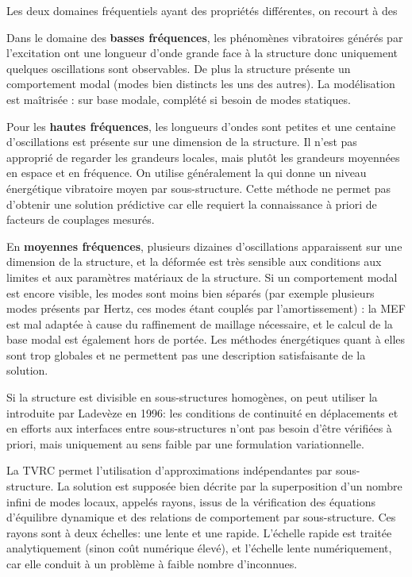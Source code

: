 Les deux domaines fréquentiels ayant des propriétés différentes, on recourt à des 

\medskip
Dans le domaine des \textbf{basses fréquences}, les phénomènes vibratoires générés par l'excitation ont une longueur
d'onde grande face à la structure donc uniquement quelques oscillations sont observables. De plus
la structure présente un comportement modal (modes bien distincts les uns des autres).
La modélisation est maîtrisée :  sur base modale, complété si besoin de modes
statiques.

\medskip
Pour les \textbf{hautes fréquences}, les longueurs d'ondes sont petites et une centaine d'oscillations est présente sur une
dimension de la structure. Il n'est pas approprié de regarder les grandeurs locales, mais plutôt les
grandeurs moyennées en espace et en fréquence. On utilise généralement la  
qui donne un niveau énergétique vibratoire moyen par sous-structure. Cette méthode ne permet
pas d'obtenir une solution prédictive car elle requiert la connaissance à priori de facteurs de
couplages mesurés.

\medskip
En \textbf{moyennes fréquences}, plusieurs dizaines d'oscillations apparaissent sur une dimension de la structure, et la
déformée est très sensible aux conditions aux limites et aux paramètres matériaux
de la structure. Si un comportement modal est encore visible, les modes sont moins bien
séparés (par exemple plusieurs modes présents par Hertz, ces modes étant couplés
par l'amortissement) : la MEF est mal adaptée à cause du raffinement de maillage
nécessaire, et le calcul de la base modal est également hors de portée. Les méthodes
énergétiques quant à elles sont trop globales et ne permettent pas une description satisfaisante
de la solution.

Si la structure est divisible en sous-structures homogènes, on peut utiliser la  introduite
par Ladevèze en 1996:
les conditions de continuité en déplacements et en efforts aux interfaces entre
sous-structures n'ont pas besoin d'être vérifiées à priori, mais uniquement au sens faible par une
formulation variationnelle.

La TVRC permet l'utilisation d'approximations indépendantes par sous-structure.
La solution est supposée bien décrite par la superposition d'un nombre infini de modes locaux, appelés rayons, issus de la vérification des équations d'équilibre dynamique et des relations de comportement par sous-structure. Ces rayons sont à deux échelles: une lente et une rapide. L'échelle rapide est traitée analytiquement (sinon coût numérique élevé), et l'échelle lente numériquement, car elle conduit à un problème à faible nombre d'inconnues.

